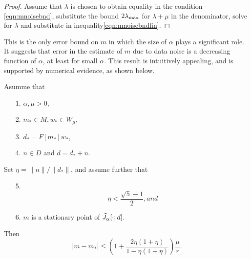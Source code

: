 \begin{proof} Assume that $\lambda$ is chosen to obtain equality in
  the condition \ref{eqn:mnoisebnd}, substitute the bound $2
  \lambda_{\rm max}$ for $\lambda + \mu$ in the denominator, solve for
  $\lambda$ and substitute in inequality\ref{eqn:mnoisebndfin}.
\end{proof}

 This is the only error bound on $m$ in which
the size of $\alpha$ plays a significant role. It
suggests that error in the estimate of $m$ due to data noise is a
decreasing function of $\alpha$, at least for small $\alpha$. This result is intuitively
appealing, and is supported by numerical evidence, as shown below.

\begin{proposition}
  \label{thm:wnoiseres}
  Asumme that
  \begin{itemize}
  \item[1. ] $\alpha, \mu> 0$,
  \item[2. ] $m_* \in M, w_* \in W_{\mu}$,
  \item[3. ] $d_* = F[m_*]w_*$,
  \item[4. ] $n \in D$ and $d = d_* + n$.
  \end{itemize}
  Set $\eta = \|n\|/\|d_*\|$, and assume further that
  \begin{itemize}
  \item[5. ]
    \begin{equation}
      \label{eqn:mnoisecond}
      \eta < \frac{\sqrt{5}-1}{2}, and
    \end{equation}
  \item[6. ] $m$ is a stationary point of $\tilde{J}_{\alpha}[\cdot;d]$.
  \end{itemize}
  Then
  \begin{equation}
    \label{eqn:mnoisesuff}
    |m-m_*| \le \left(1+\frac{2\eta(1+\eta)}{1-\eta(1+\eta)}\right)\frac{\mu}{r}.
  \end{equation}
\end{proposition}

